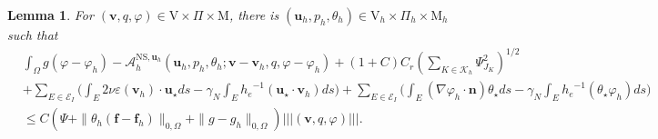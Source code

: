 \documentclass[10pt,a4paper]{article}
\newtheorem{lemma} {\bf Lemma}
\begin{document}
\begin{lemma}\label{SRL3}
     For $\left( \boldsymbol{v},q, \varphi \right) \in \mathrm{V} \times \Pi \times \mathrm{M} $, there is $(\boldsymbol{u}_h, p_h, \theta_h) \in \mathrm{V}_h \times \Pi_h \times \mathrm{M}_h$ such that 
     \begin{align*}
    &  \int_{\Omega} g ( \varphi - \varphi_h )   - \mathcal{A}_h^{\mathrm{NS},\boldsymbol{u}_h}(\boldsymbol{u}_h,p_h, \theta_h; \boldsymbol{v}-\boldsymbol{v}_h,q, \varphi - \varphi_h ) + (1+C) C_r \left( \sum_{K \in \mathcal{K}_h} \Psi_{J_K}^2  \right)^{1/2} \\ & +  \sum_{E\in \mathcal{E}_I}\bigg(\int_{E} 2 \nu \varepsilon(\boldsymbol{v}_h) \cdot \boldsymbol{u}_{\star} d s - \gamma_N \int_{E} {h_e}^{-1}(\boldsymbol{u}_{\star} \cdot \boldsymbol{v}_h) d s  \bigg) + \sum_{E\in \mathcal{E}_I}\bigg( \int_{E} (\nabla \varphi_h \cdot \boldsymbol{n}) \theta_{\star} d s - \gamma_N \int_{E} {h_e}^{-1}(\theta_{\star} \varphi_h)d s \bigg) \\
    & \leq C \left(\Psi + \| \theta_h ( \boldsymbol{f} - \boldsymbol{f}_h) \|_{0,\Omega} + \| g -g_h\|_{0,\Omega} \right) \left|\!\left|\!\left| (\boldsymbol{v}, q, \varphi)\right|\!\right|\!\right|.
     \end{align*}
\end{lemma}
\end{document}
